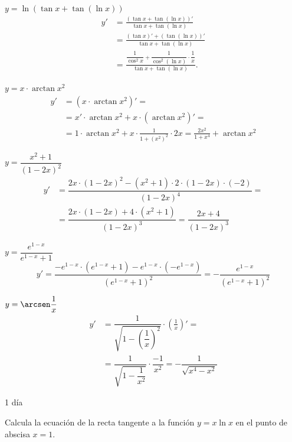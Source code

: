 \begin{ejemplo}
 \quad $y=\ln\left(\tan x+\tan(\ln x)\right)$
\[\begin{aligned}
    y'&=\frac{\left(\tan x+\tan(\ln x)\right)'}{\tan x+\tan(\ln x)}\\
      &=\frac{(\tan x)'+\left(\tan(\ln x)\right)'}{\tan x+\tan(\ln x)}\\
      &=\frac{\dfrac1{\cos^2 x}+\dfrac1{\cos^2(\ln x)}\cdot\dfrac1x}
              {\tan x+\tan(\ln x)}.
\end{aligned}\]

 \quad $y=x\cdot\arctan{x^2}$
\[\begin{aligned}
    y'&=\left(x\cdot\arctan{x^2}\right)'=\\
        &=x'\cdot\arctan{x^2}+x\cdot\left(\arctan{x^2}\right)'=\\
        &=1\cdot\arctan{x^2}+x\cdot\frac1{1+(x^2)^2}\cdot2x=\frac{2x^2}{1+x^4}+\arctan{x^2}
\end{aligned}\]

 \quad $y=\dfrac{x^2+1}{(1-2x)^2}$
 \[\begin{aligned}
    y'&=\dfrac{2x\cdot(1-2x)^2-(x^2+1)\cdot2\cdot(1-2x)\cdot(-2)}{(1-2x)^4}=\\
        &=\dfrac{2x\cdot(1-2x)+4\cdot(x^2+1)}{(1-2x)^3}
            =\dfrac{2x+4}{(1-2x)^3}
\end{aligned}\]

 \quad $y=\dfrac{e^{1-x}}{e^{1-x}+1}$
 \[y'=\dfrac{-e^{1-x}\cdot(e^{1-x}+1)-e^{1-x}\cdot(-e^{1-x})}{(e^{1-x}+1)^2}
        =-\dfrac{e^{1-x}}{(e^{1-x}+1)^2}
\]

 \quad $y=\arcsen\dfrac1{x}$
 \[\begin{aligned}
    y'&=\dfrac1{\sqrt{1-\left(\dfrac1x\right)^2}}\cdot\left(\frac1x\right)'=\\
        &=\dfrac1{\sqrt{1-\dfrac1{x^2}}}\cdot\dfrac{-1}{x^2}
            =-\dfrac{1}{\sqrt{x^4-x^2}}
\end{aligned}\]

\end{ejemplo}

\begin{definicion}{1 día}
\end{definicion}

\begin{ejemplo}{
    Calcula la ecuación de la recta tangente a la función $y=x\ln{x}$ en el punto de abscisa $x=1$.
}
\end{ejemplo}

